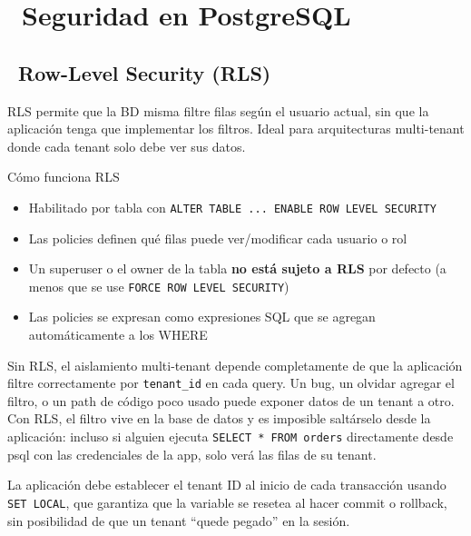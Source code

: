\chapter[Seguridad en PostgreSQL]{~Seguridad en PostgreSQL}

\section[Row-Level Security (RLS)]{~Row-Level Security (RLS)}

RLS permite que la BD misma filtre filas según el usuario actual, sin que la aplicación tenga que implementar los filtros.
Ideal para arquitecturas multi-tenant donde cada tenant solo debe ver sus datos.

\begin{teoriabox}{Cómo funciona RLS}
\begin{itemize}
  \item Habilitado por tabla con \texttt{ALTER TABLE ... ENABLE ROW LEVEL SECURITY}
  \item Las policies definen qué filas puede ver/modificar cada usuario o rol
  \item Un superuser o el owner de la tabla \textbf{no está sujeto a RLS} por defecto (a menos que se use \texttt{FORCE ROW LEVEL SECURITY})
  \item Las policies se expresan como expresiones SQL que se agregan automáticamente a los WHERE
\end{itemize}
\end{teoriabox}

Sin RLS, el aislamiento multi-tenant depende completamente de que la aplicación filtre correctamente por \texttt{tenant\_id} en cada query.
Un bug, un olvidar agregar el filtro, o un path de código poco usado puede exponer datos de un tenant a otro.
Con RLS, el filtro vive en la base de datos y es imposible saltárselo desde la aplicación: incluso si alguien ejecuta \texttt{SELECT * FROM orders} directamente desde psql con las credenciales de la app, solo verá las filas de su tenant.

La aplicación debe establecer el tenant ID al inicio de cada transacción usando \texttt{SET LOCAL}, que garantiza que la variable se resetea al hacer commit o rollback, sin posibilidad de que un tenant ``quede pegado'' en la sesión.

